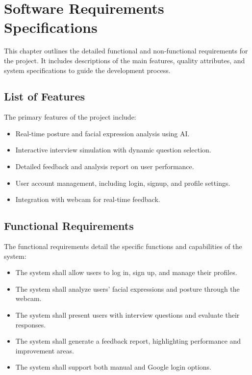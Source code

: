\chapter{Software Requirements Specifications} \label{ch
}

This chapter outlines the detailed functional and non-functional requirements for the project. It includes descriptions of the main features, quality attributes, and system specifications to guide the development process.

\section{List of Features} The primary features of the project include: \begin{itemize} \item Real-time posture and facial expression analysis using AI. \item Interactive interview simulation with dynamic question selection. \item Detailed feedback and analysis report on user performance. \item User account management, including login, signup, and profile settings. \item Integration with webcam for real-time feedback. \end{itemize}

\section{Functional Requirements} The functional requirements detail the specific functions and capabilities of the system: \begin{itemize} \item The system shall allow users to log in, sign up, and manage their profiles. \item The system shall analyze users' facial expressions and posture through the webcam. \item The system shall present users with interview questions and evaluate their responses. \item The system shall generate a feedback report, highlighting performance and improvement areas. \item The system shall support both manual and Google login options. \end{itemize}

